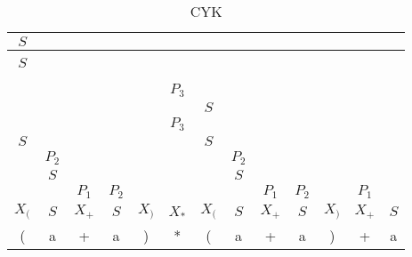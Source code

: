 \documentclass{article}
\begin{document}
\begin{table}[h!]
	\centering
	\caption{CYK}
	\begin{tabular}{|c|c|c|c|c|c|c|c|c|c|c|c|c|}
		\hline
		$S$ &  &  &  &  &  &  &  &  &  &  &  & \\
		\hline
		 &  &  &  &  &  &  &  &  &  &  &  & \\
		\hline
		$S$ &  &  &  &  &  &  &  &  &  &  &  & \\
		\hline
		 &  &  &  &  &  &  &  &  &  &  &  & \\
		\hline
		 &  &  &  &  &  &  &  &  &  &  &  & \\
		\hline
		 &  &  &  &  & $P_3$ &  &  &  &  &  &  & \\
		\hline
		 &  &  &  &  &  & $S$ &  &  &  &  &  & \\
		\hline
		 &  &  &  &  & $P_3$ &  &  &  &  &  &  & \\
		\hline
		$S$ &  &  &  &  &  & $S$ &  &  &  &  &  & \\
		\hline
		 & $P_2$ &  &  &  &  &  & $P_2$ &  &  &  &  & \\
		\hline
		 & $S$ &  &  &  &  &  & $S$ &  &  &  &  & \\
		\hline
		 &  & $P_1$ & $P_2$ &  &  &  &  & $P_1$ & $P_2$ &  & $P_1$ & \\
		\hline
		$X_($ & $S$ & $X_+$ & $S$ & $X_)$ & $X_*$ & $X_($ & $S$ & $X_+$ & $S$ & $X_)$ & $X_+$ & $S$\\
		\hline
		\hline
		( & a & + & a & ) & * & ( & a & + & a & ) & + & a\\
		\hline
	\end{tabular}
\end{table}
\end{document}

